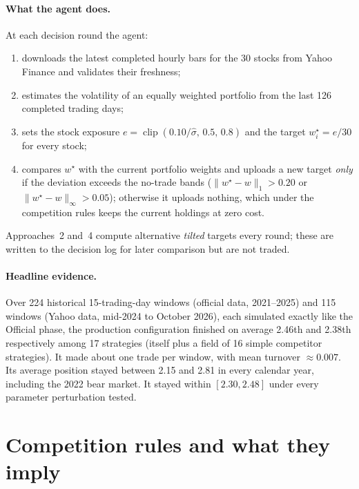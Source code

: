 \documentclass[11pt,a4paper]{article}
\DeclareMathOperator{\clip}{clip}
\begin{document}
\paragraph{What the agent does.} At each decision round the agent:
\begin{enumerate}[nosep]
  \item downloads the latest completed hourly bars for the 30 stocks from Yahoo Finance and validates their freshness;
  \item estimates the volatility of an equally weighted portfolio from the last 126 completed trading days;
  \item sets the stock exposure $e=\clip(0.10/\hat\sigma,\,0.5,\,0.8)$ and the target $w^\star_i=e/30$ for every stock;
  \item compares $w^\star$ with the current portfolio weights and uploads a new target \emph{only} if the deviation
        exceeds the no-trade bands ($\|w^\star-w\|_1>0.20$ or $\|w^\star-w\|_\infty>0.05$); otherwise it uploads nothing,
        which under the competition rules keeps the current holdings at zero cost.
\end{enumerate}
Approaches~2 and~4 compute alternative \emph{tilted} targets every round; these are written to the decision log
for later comparison but are not traded.

\paragraph{Headline evidence.} Over 224 historical 15-trading-day windows (official data, 2021--2025) and 115 windows
(Yahoo data, mid-2024 to October 2026), each simulated exactly like the Official phase, the production configuration
finished on average 2.46th and 2.38th respectively among 17 strategies (itself plus a field of 16 simple competitor
strategies). It made about one trade per window, with mean turnover $\approx0.007$. Its average position stayed between 2.15 and 2.81 in
every calendar year, including the 2022 bear market. It stayed within $[2.30,2.48]$ under every parameter perturbation tested.

\section{Competition rules and what they imply}\label{sec:rules}
\end{document}
